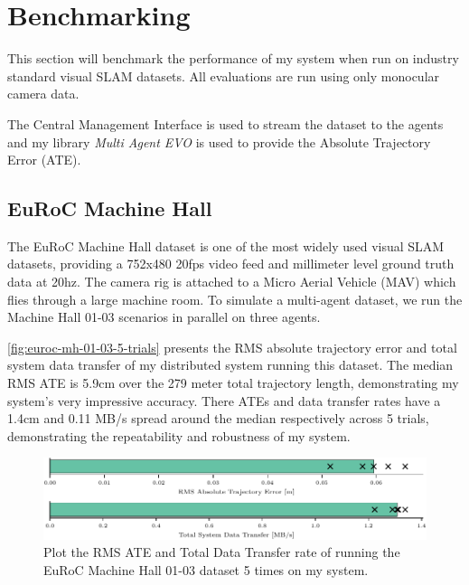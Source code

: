 \section{Benchmarking}
\label{sec:benchmarking}
This section will benchmark the performance of my system when run on industry standard visual SLAM datasets. All evaluations are run using only monocular camera data.

The Central Management Interface is used to stream the dataset to the agents and my library \textit{Multi Agent EVO} is used to provide the Absolute Trajectory Error (ATE).

\subsection{EuRoC Machine Hall}
\label{sec:euroc-machine-hall}
The EuRoC Machine Hall dataset \autocite{burri2016euroc} is one of the most widely used visual SLAM datasets, providing a 752x480 20fps video feed and millimeter level ground truth data at 20hz. The camera rig is attached to a Micro Aerial Vehicle (MAV) which flies through a large machine room. To simulate a multi-agent dataset, we run the Machine Hall 01-03 scenarios in parallel on three agents.


\autoref{fig:euroc-mh-01-03-5-trials} presents the RMS absolute trajectory error and total system data transfer of my distributed system running this dataset. The median RMS ATE is 5.9cm over the 279 meter total trajectory length, demonstrating my system's very impressive accuracy. There ATEs and data transfer rates have a 1.4cm and 0.11 MB/s spread around the median respectively across 5 trials, demonstrating the repeatability and robustness of my system.

\begin{figure}[h]
    \centering
    \includegraphics[width=\linewidth]{figures/comparison_apr11_mh_trajectory_b.pdf}

    \caption{Plot the RMS ATE and Total Data Transfer rate of running the EuRoC Machine Hall 01-03 dataset 5 times on my system.}
    \label{fig:euroc-mh-01-03-5-trials}
\end{figure}

